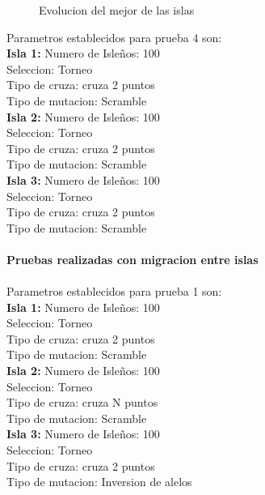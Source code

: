 \documentclass[10pt,letterpaper]{article}
\begin{document}
\begin{figure}[H]
      \begin{center}
        \caption{Evolucion del mejor de las islas}
        \label{Patron de señales para reconocimiento de señal Gaussiana}
      \end{center}
    \end{figure}

Parametros establecidos para prueba 4 son:
\\
\textbf{Isla 1:} Numero de Isleños: 100\\
Seleccion: Torneo\\ 
Tipo de cruza: cruza 2 puntos\\
Tipo de mutacion: Scramble\\
\textbf{Isla 2:} Numero de Isleños: 100\\
Seleccion: Torneo\\ 
Tipo de cruza: cruza 2 puntos\\
Tipo de mutacion: Scramble\\
\textbf{Isla 3:} Numero de Isleños: 100\\
Seleccion: Torneo\\ 
Tipo de cruza: cruza 2 puntos\\
Tipo de mutacion: Scramble
\\\\
\textbf{\large Pruebas realizadas con migracion entre islas}
\\\\
Parametros establecidos para prueba 1 son:
\\
\textbf{Isla 1:} Numero de Isleños: 100\\
Seleccion: Torneo\\ 
Tipo de cruza: cruza 2 puntos\\
Tipo de mutacion: Scramble\\
\textbf{Isla 2:} Numero de Isleños: 100\\
Seleccion: Torneo\\ 
Tipo de cruza: cruza N puntos\\
Tipo de mutacion: Scramble\\
\textbf{Isla 3:} Numero de Isleños: 100\\
Seleccion: Torneo\\ 
Tipo de cruza: cruza 2 puntos\\
Tipo de mutacion: Inversion de alelos
\end{document}
